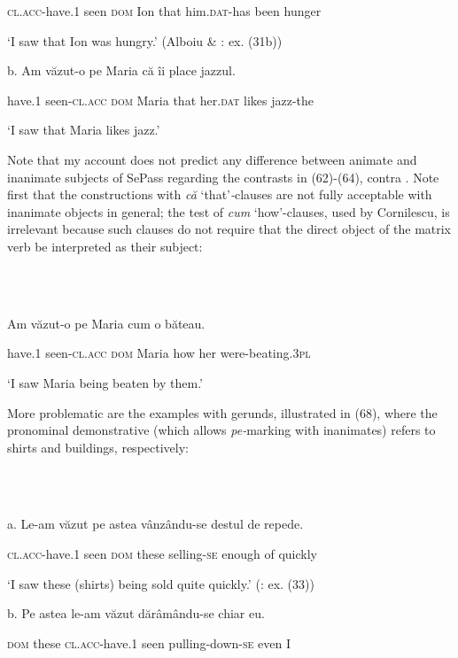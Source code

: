 \documentclass[output=paper]{langsci/langscibook}
\begin{document}
      \textsc{cl.acc-}have.1 seen   \textsc{dom} Ion that him.\textsc{dat-}has been hunger

      ‘I saw that Ion was hungry.’ (Alboiu \& \citealt{Hill2016}: ex. (31b))

b.   Am    văzut-o          pe     Maria că    îi           place jazzul.

     have.1 seen{}-\textsc{cl.acc} \textsc{dom}  Maria that her.\textsc{dat} likes  jazz-the 

    ‘I saw that Maria likes jazz.’

Note that my account does not predict any difference between animate and inanimate subjects of SePass regarding the contrasts in (62)-(64), contra \citet{Cornilescu1998}. Note first that the constructions with \textit{că} ‘that’\textit{{}-}clauses are not fully acceptable with inanimate objects in general; the test of \textit{cum} ‘how’-clauses, used by Cornilescu, is irrelevant because such clauses do not require that the direct object of the matrix verb be interpreted as their subject:

\ea%
    \label{ex:key:67}
    \gll\\
        \\
    \glt
    \z

          Am      văzut-o         pe     Maria cum o    băteau.

   have.1 seen-\textsc{cl.acc dom} Maria how  her were-beating.3\textsc{pl}

‘I saw Maria being beaten by them.’  

More problematic are the examples with gerunds, illustrated in (68), where the pronominal demonstrative (which allows \textit{pe-}marking with inanimates) refers to shirts and buildings, respectively: 

\ea%
    \label{ex:key:68}
    \gll\\
        \\
    \glt
    \z

          a.   Le-am              văzut pe    astea vânzându-se destul   de  repede.

      \textsc{cl.acc}{}-have.1 seen  \textsc{dom} these selling-\textsc{se}      enough of  quickly      

      ‘I saw these (shirts) being sold quite quickly.’ (\citealt{Cornilescu1998}: ex. (33))

b.   Pe   astea  le-am               văzut dărâmându-se      chiar eu. 

        \textsc{dom} these \textsc{cl.acc-}have.1 seen  pulling-down-\textsc{se} even I     
\end{document}
